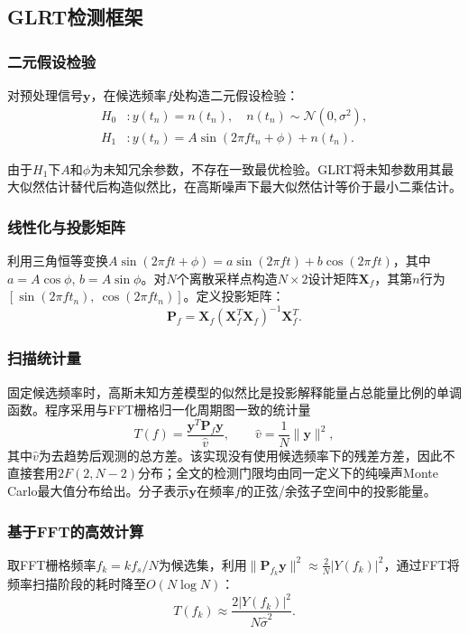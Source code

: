 \documentclass[withoutpreface,bwprint]{cumcmthesis}
\begin{document}
\subsection{GLRT检测框架}
\subsubsection{二元假设检验}
对预处理信号$\mathbf{y}$，在候选频率$f$处构造二元假设检验：
\begin{align}
H_0 &: y(t_n) = n(t_n), \quad n(t_n) \sim \mathcal{N}(0, \sigma^2), \\
H_1 &: y(t_n) = A\sin(2\pi f t_n + \phi) + n(t_n).
\end{align}

由于$H_1$下$A$和$\phi$为未知冗余参数，不存在一致最优检验。GLRT将未知参数用其最大似然估计替代后构造似然比，在高斯噪声下最大似然估计等价于最小二乘估计。

\subsubsection{线性化与投影矩阵}
利用三角恒等变换$A\sin(2\pi f t + \phi) = a\sin(2\pi f t) + b\cos(2\pi f t)$，其中$a = A\cos\phi$, $b = A\sin\phi$。对$N$个离散采样点构造$N \times 2$设计矩阵$\mathbf{X}_f$，其第$n$行为$[\sin(2\pi f t_n),\ \cos(2\pi f t_n)]$。定义投影矩阵：
\begin{equation}
\mathbf{P}_f = \mathbf{X}_f(\mathbf{X}_f^T \mathbf{X}_f)^{-1} \mathbf{X}_f^T.
\end{equation}

\subsubsection{扫描统计量}
固定候选频率时，高斯未知方差模型的似然比是投影解释能量占总能量比例的单调函数。程序采用与FFT栅格归一化周期图一致的统计量
\begin{equation}
T(f) = \frac{\mathbf{y}^T \mathbf{P}_f \mathbf{y}}{\hat v},
\qquad
\hat v=\frac{1}{N}\|\mathbf y\|^2 ,
\label{eq:glrt_stat}
\end{equation}
其中$\hat v$为去趋势后观测的总方差。该实现没有使用候选频率下的残差方差，因此不直接套用$2F(2,N-2)$分布；全文的检测门限均由同一定义下的纯噪声Monte Carlo最大值分布给出。分子表示$\mathbf y$在频率$f$的正弦/余弦子空间中的投影能量。

\subsubsection{基于FFT的高效计算}
取FFT栅格频率$f_k = k f_s/N$为候选集，利用$\|\mathbf{P}_{f_k} \mathbf{y}\|^2 \approx \frac{2}{N}|Y(f_k)|^2$，通过FFT将频率扫描阶段的耗时降至$O(N\log N)$：
\begin{equation}
T(f_k) \approx \frac{2|Y(f_k)|^2}{N \hat{\sigma}^2}.
\end{equation}
\end{document}
